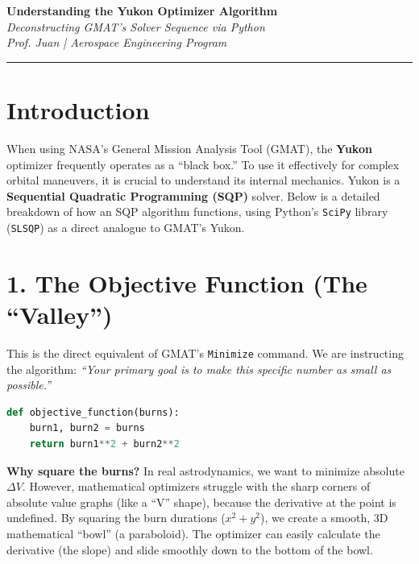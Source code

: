 \documentclass[11pt, letterpaper]{article}
\begin{document}
\begin{center}
    {\Large \textbf{Understanding the Yukon Optimizer Algorithm}} \\
    \vspace{0.2cm}
    {\large \textit{Deconstructing GMAT's Solver Sequence via Python}} \\
    \vspace{0.4cm}
    \textit{Prof. Juan | Aerospace Engineering Program}
\end{center}
\hrule
\vspace{0.5cm}

\section*{Introduction}
When using NASA's General Mission Analysis Tool (GMAT), the \textbf{Yukon} optimizer frequently operates as a ``black box.'' To use it effectively for complex orbital maneuvers, it is crucial to understand its internal mechanics. Yukon is a \textbf{Sequential Quadratic Programming (SQP)} solver. Below is a detailed breakdown of how an SQP algorithm functions, using Python's \texttt{SciPy} library (\texttt{SLSQP}) as a direct analogue to GMAT's Yukon.

\section*{1. The Objective Function (The ``Valley'')}

This is the direct equivalent of GMAT's \texttt{Minimize} command. We are instructing the algorithm: \textit{``Your primary goal is to make this specific number as small as possible.''}

\begin{lstlisting}[language=Python]
def objective_function(burns):
    burn1, burn2 = burns
    return burn1**2 + burn2**2 
\end{lstlisting}

\textbf{Why square the burns?} In real astrodynamics, we want to minimize absolute $\Delta V$. However, mathematical optimizers struggle with the sharp corners of absolute value graphs (like a ``V'' shape), because the derivative at the point is undefined. By squaring the burn durations ($x^2 + y^2$), we create a smooth, 3D mathematical ``bowl'' (a paraboloid). The optimizer can easily calculate the derivative (the slope) and slide smoothly down to the bottom of the bowl.
\end{document}
